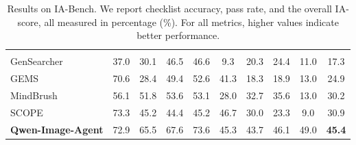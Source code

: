 \documentclass{llmxive}
\begin{document}
\begin{table}[t]
{\begin{tabular}{lccccccccc}
\midrule
\rowcolor{gray!8}
\multicolumn{10}{l}{\textit{Agentic Image Generation Models}} \\
GenSearcher~\citep{Feng2026GenSearcherRA}
& 37.0 & 30.1 & 46.5 & 46.6
& 9.3 & 20.3 & 24.4 & 11.0
& 17.3 \\
GEMS~\citep{He2026GEMSAM}
& 70.6 & 28.4 & 49.4 & 52.6
& 41.3 & 18.3 & 18.9 & 13.0
& 24.9 \\
MindBrush~\citep{He2026MindBrushIA}
& 56.1 & 51.8 & 53.6 & 53.1
& 28.0 & 32.7 & 35.6 & 13.0
& 30.2 \\
SCOPE~\citep{Ren2026SCOPESD}
& 73.3 & 45.2 & 44.4 & 45.2
& 46.7 & 30.0 & 23.3 & 9.0
& 30.9 \\
\rowcolor{blue!8}
\textbf{Qwen-Image-Agent}
& 72.9 & 65.5 & 67.6 & 73.6
& 45.3 & 43.7 & 46.1 & 49.0
& {\textbf{45.4}} \\
\bottomrule
\end{tabular}
}
\caption{Results on IA-Bench. We report checklist accuracy, pass rate, and the overall IA-score, all measured in percentage (\%). For all metrics, higher values indicate better performance.
}
\label{tab:ia_bench}
\end{table}
\end{document}
